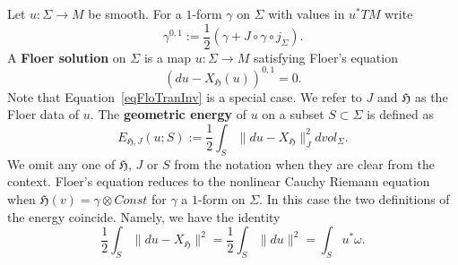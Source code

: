 \documentclass[11pt]{amsart}
\theoremstyle{definition}
\theoremstyle{remark}
\begin{document}
Let $u:\Sigma\to M$ be smooth. For a $1$-form $\gamma$ on $\Sigma$ with values in $u^*TM$ write
\[
\gamma^{0,1}:=\frac12\left(\gamma+J\circ\gamma\circ j_\Sigma\right).
\]
A \textbf{Floer solution} on $\Sigma$ is a map $u:\Sigma\to M$ satisfying Floer's equation
\begin{equation}
(du-X_\mathfrak{H}(u))^{0,1}=0.
\end{equation}
Note that Equation~\eqref{eqFloTranInv} is a special case. We refer to $J$ and $\mathfrak{H}$ as the Floer data of $u$. The \textbf{geometric energy} of $u$ on a subset $S\subset\Sigma$ is defined as
\[
E_{\mathfrak{H},J}(u;S):=\frac1{2}\int_S\|du-X_\mathfrak{H}\|_J^2dvol_\Sigma.
\]
We omit any one of $\mathfrak{H}$, $J$ or $S$ from the notation when they are clear from the context.  Floer's equation reduces to the nonlinear Cauchy Riemann equation when $\mathfrak{H}(v)=\gamma\otimes Const$ for $\gamma$ a $1$-form on $\Sigma$. In this case the two definitions of the energy coincide. Namely, we have the identity
\begin{equation}\label{eqEnId}
\frac1{2}\int_S\|du-X_\mathfrak{H}\|^2=\frac1{2}\int_S\|du\|^2=\int_Su^*\omega.
\end{equation}
\end{document}
